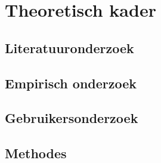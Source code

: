 \section{Theoretisch kader}
\subsection{Literatuuronderzoek}
\subsection{Empirisch onderzoek}
\subsection{Gebruikersonderzoek}
\subsection{Methodes}


